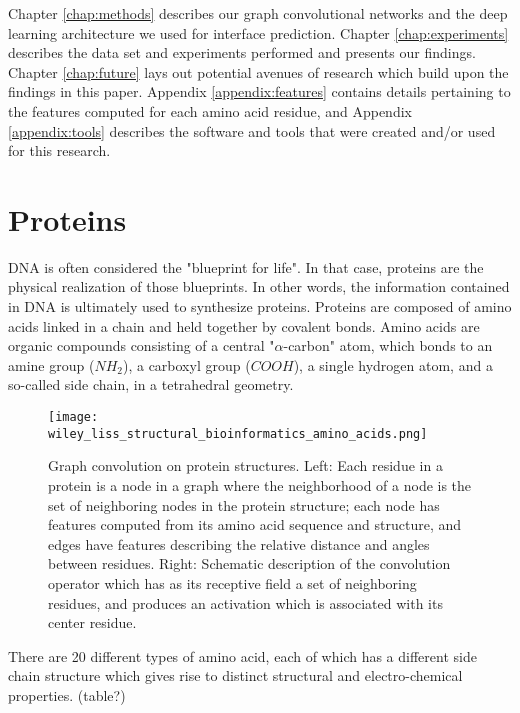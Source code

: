 Chapter \ref{chap:methods} describes our graph convolutional networks and the deep learning architecture we used for interface prediction. Chapter \ref{chap:experiments} describes the data set and experiments performed and presents our findings. Chapter \ref{chap:future} lays out potential avenues of research which build upon the findings in this paper. Appendix \ref{appendix:features} contains details pertaining to the features computed for each amino acid residue, and Appendix \ref{appendix:tools} describes the software and tools that were created and/or used for this research.

\section{Proteins}

DNA is often considered the "blueprint for life". 
In that case, proteins are the physical realization of those blueprints.
In other words, the information contained in DNA is ultimately used to synthesize proteins.
Proteins are composed of amino acids linked in a chain and held together by covalent bonds.
Amino acids are organic compounds consisting of a central "$\alpha$-carbon" atom, which bonds to an amine group ($NH_2$), a carboxyl group ($COOH$), a single hydrogen atom, and a so-called side chain, in a tetrahedral geometry.

\begin{figure}
	\centering
	\texttt{[image: wiley\_liss\_structural\_bioinformatics\_amino\_acids.png]}
	\caption{\small Graph convolution on protein structures.  Left:  Each residue in a protein is a node in a graph where the neighborhood of a node is the set of neighboring nodes in the protein structure; each node has features computed from its amino acid sequence and structure, and edges have features describing the relative distance and angles between residues.  Right:  Schematic description of the convolution operator which has as its receptive field a set of neighboring residues, and produces an activation which is associated with its center residue.}
	\label{fig:graph_rep}
\end{figure}

There are 20 different types of amino acid, each of which has a different side chain structure which gives rise to distinct structural and electro-chemical properties. (table?)

